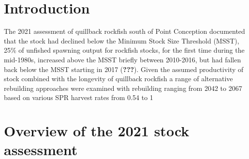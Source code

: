 \documentclass[11pt,
  english,
  a4paper,
]{article}
\begin{document}
\leavevmode\tagmcend\tagstructend\par

\pagebreak
\setlength{\parskip}{5mm plus1mm minus1mm}
\setcounter{page}{1}
\renewcommand{\thefigure}{\arabic{figure}}
\renewcommand{\thetable}{\arabic{table}}
\setcounter{table}{0}
\setcounter{figure}{0}

\setlength\parskip{0.2em plus 0.1em minus 0.2em}


\hypertarget{introduction}{%
\section{Introduction}\label{introduction}}

\leavevmode\tagmcend\tagstructend


The 2021 assessment of quillback rockfish south of Point Conception documented that the stock had declined below the Minimum Stock Size Threshold (MSST), 25\% of unfished spawning output for rockfish stocks, for the first time during the mid-1980s, increased above the MSST briefly between 2010-2016, but had fallen back below the MSST starting in 2017 {({\textbf{???}})\leavevmode\tagmcend\tagstructend}. Given the assumed productivity of stock combined with the longevity of quillback rockfish a range of alternative rebuilding approaches were examined with rebuilding ranging from 2042 to 2067 based on various SPR harvest rates from 0.54 to 1

\leavevmode\tagmcend\tagstructend\par


\hypertarget{overview-of-the-2021-stock-assessment}{%
\section{Overview of the 2021 stock assessment}\label{overview-of-the-2021-stock-assessment}}

\leavevmode\tagmcend\tagstructend

\end{document}
